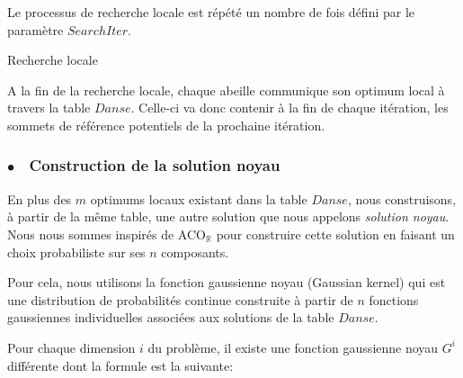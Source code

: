 Le processus de recherche locale est répété un nombre de fois défini par le paramètre $SearchIter$.

\vspace{0.5em}

\begin{algorithm}[H]
	\caption{Recherche locale}
\end{algorithm}

A la fin de la recherche locale, chaque abeille communique son optimum local à travers la table $Danse$. Celle-ci va donc contenir à la fin de chaque itération, les sommets de référence potentiels de la prochaine itération.

\begin{spacing}{1.4}

\subsubsection{$\bullet\quad$Construction de la solution noyau}

En plus des $m$ optimums locaux existant dans la table $Danse$, nous construisons, à partir de la même table, une autre solution que nous appelons \emph{solution noyau}. Nous nous sommes inspirés de ACO$_\mathbb{R}$ \cite{SOCHA_DORIGO_2006} pour construire cette solution en faisant un choix probabiliste sur ses $n$ composants.

\vspace{1em}

Pour cela, nous utilisons la fonction gaussienne noyau (Gaussian kernel) qui est une distribution de probabilités continue construite à partir de $n$ fonctions gaussiennes individuelles associées aux solutions de la table $Danse$.
\end{spacing}

\parbox[t][1em]{\textwidth}{}

Pour chaque dimension $i$ du problème, il existe une fonction gaussienne noyau $G^i$ différente dont la formule est la suivante:

